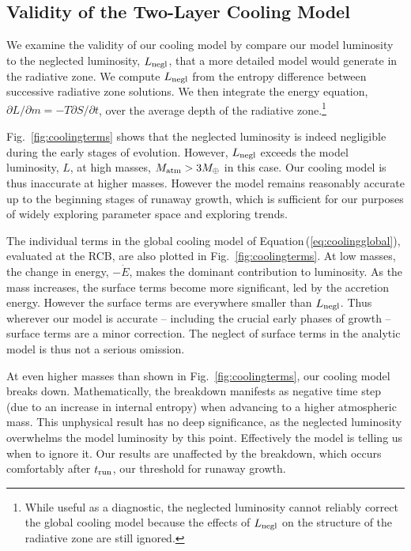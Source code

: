 \documentclass[apj, numberedappendix]{emulateapj}
\newcommand{\p}{\partial}
\newcommand{\Eq}[1]{Equation\,(\ref{#1})}
\newcommand{\Fig}[1]{Fig.~\ref{#1}}
\begin{document}
\subsection{Validity of the Two-Layer Cooling Model}
\label{sec:endoftime}

We examine the  validity of our cooling model by compare our model luminosity to the neglected luminosity, $L_{\rm negl}$,  that a more detailed model would generate in the radiative zone.  We compute $L_{\rm negl}$ from the entropy difference between successive radiative zone solutions.  We then integrate the energy equation, $\p L / \p m = - T \p S/ \p t$, over the average depth of the radiative zone.\footnote{While useful as a diagnostic, the neglected luminosity cannot reliably correct the global cooling model because the effects of $L_{\rm negl}$ on the structure of the radiative zone are still ignored.}

 \Fig{fig:coolingterms} shows that the neglected luminosity is indeed negligible during the early stages of evolution.  However, $L_{\rm negl}$ exceeds the model luminosity, $L$, at high masses, $M_{\rm atm} > 3 M_\oplus$ in this case.  Our cooling model is thus inaccurate at higher masses.  However the model remains reasonably accurate up to the beginning stages of runaway growth, which is sufficient for our purposes of widely exploring parameter space and exploring trends.
 
The individual terms in the global cooling model of \Eq{eq:coolingglobal}, evaluated at the RCB, are also plotted in \Fig{fig:coolingterms}.  At low masses, the change in energy, $- \dot{E}$, makes the dominant contribution to luminosity.  As the mass increases, the surface terms become more significant, led by the accretion energy.  However the surface terms are everywhere smaller than $L_{\rm negl}$.  Thus wherever our model is accurate -- including the crucial early phases of growth -- surface terms are a minor correction.  The neglect of surface terms in the analytic model is thus not a serious omission.

At even higher masses than shown in \Fig{fig:coolingterms}, our cooling model breaks down.  Mathematically, the breakdown manifests as negative time step (due to an increase in internal entropy) when advancing to a higher atmospheric mass.  This unphysical result has no deep significance, as the neglected luminosity overwhelms the model luminosity by this point.    Effectively the model is telling us when to ignore it.  Our results are unaffected by the breakdown, which occurs comfortably after $t_{\rm run}$, our threshold for runaway growth.  
\end{document}
